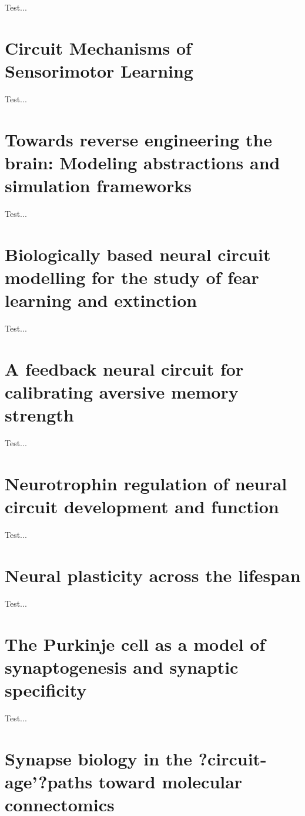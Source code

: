 \documentclass[11pt, a4paper, oneside]{article}   	%
\begin{document}
Test...

\section{Circuit Mechanisms of Sensorimotor Learning \cite{Makino2016}}

Test...

\section{Towards reverse engineering the brain: Modeling abstractions and simulation frameworks \cite{Nageswaran2010}}

Test...

\section{Biologically based neural circuit modelling for the study of fear learning and extinction \cite{Nair2016}}

Test...

\section{A feedback neural circuit for calibrating aversive memory strength \cite{Ozawa2016}}

Test...

\section{Neurotrophin regulation of neural circuit development and function \cite{Park2013}}

Test...

\section{Neural plasticity across the lifespan \cite{Power2016}}

Test...

\section{The Purkinje cell as a model of synaptogenesis and synaptic specificity \cite{Sasso??-Pognetto2016}}

Test...

\section{Synapse biology in the ?circuit-age'?paths toward molecular connectomics \cite{Schreiner2017}}
\end{document}
